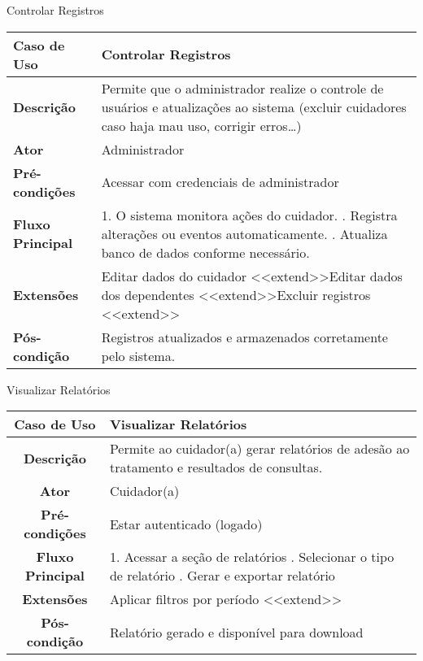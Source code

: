 \begin{quadro}
    \caption{\label{quadro_controlar_registros}Controlar Registros}
    \begin{tabular}{|l|p{12cm}|}
        \hline
        \textbf{Caso de Uso} & Controlar Registros \\ \hline
        \textbf{Descrição} & Permite que o administrador realize o controle de usuários e atualizações ao sistema (excluir cuidadores caso haja mau uso, corrigir erros…) \\ \hline
        \textbf{Ator} & Administrador \\ \hline
        \textbf{Pré-condições} & Acessar com credenciais de administrador \\ \hline
        \textbf{Fluxo Principal} & 1. O sistema monitora ações do cuidador. \newline 2. Registra alterações ou eventos automaticamente. \newline 3. Atualiza banco de dados conforme necessário. \\ \hline
        \textbf{Extensões} & Editar dados do cuidador \textless\textless extend\textgreater\textgreater \newline Editar dados dos dependentes \textless\textless extend\textgreater\textgreater \newline Excluir registros \textless\textless extend\textgreater\textgreater \\ \hline
        \textbf{Pós-condição} & Registros atualizados e armazenados corretamente pelo sistema. \\ \hline
    \end{tabular}
\end{quadro}


\begin{quadro}
    \caption{\label{quadro_visualizar_relatorios}Visualizar Relatórios}
    \begin{tabular}{|c|p{12cm}|}
        \hline
        \textbf{Caso de Uso} & Visualizar Relatórios \\ \hline
        \textbf{Descrição} & Permite ao cuidador(a) gerar relatórios de adesão ao tratamento e resultados de consultas. \\ \hline
        \textbf{Ator} & Cuidador(a) \\ \hline
        \textbf{Pré-condições} & Estar autenticado (logado) \\ \hline
        \textbf{Fluxo Principal} & 1. Acessar a seção de relatórios \newline 2. Selecionar o tipo de relatório \newline 3. Gerar e exportar relatório \\ \hline
        \textbf{Extensões} & Aplicar filtros por período \textless\textless extend\textgreater\textgreater \\ \hline
        \textbf{Pós-condição} & Relatório gerado e disponível para download \\ \hline
    \end{tabular}
\end{quadro}

